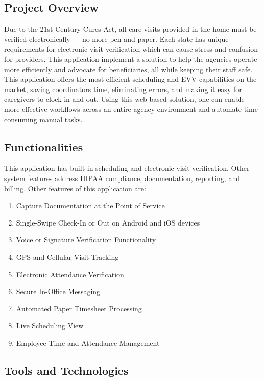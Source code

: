 \subsection{Project Overview}

Due to the 21st Century Cures Act, all care visits provided in the home must be verified electronically — no more pen and paper.
Each state has unique requirements for electronic visit verification which can cause stress and confusion for providers.
This application implement a solution to help the agencies operate more efficiently and advocate for beneficiaries, all while keeping their staff safe. \\

This application offers the most efficient scheduling and EVV capabilities on the market, saving coordinators time, eliminating errors, and making it easy for caregivers to clock in and out.
Using this web-based solution, one can enable more effective workflows across an entire agency environment and automate time-consuming manual tasks.


\subsection{Functionalities}

This application has built-in scheduling and electronic visit verification.
Other system features address HIPAA compliance, documentation, reporting, and billing.
Other features of this application are:

\begin{enumerate}
    \item Capture Documentation at the Point of Service 
    \item Single-Swipe Check-In or Out on Android and iOS devices
    \item Voice or Signature Verification Functionality
    \item GPS and Cellular Visit Tracking
    \item Electronic Attendance Verification
    \item Secure In-Office Messaging
    \item Automated Paper Timesheet Processing
    \item Live Scheduling View
    \item Employee Time and Attendance Management
\end{enumerate}

\subsection{Tools and Technologies}

